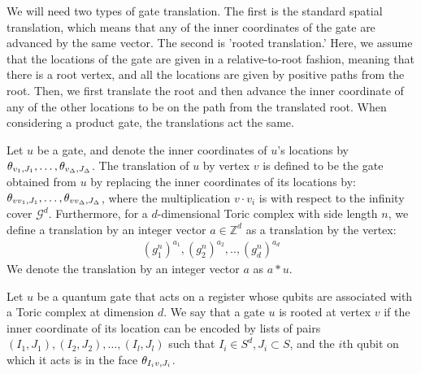 We will need two types of gate translation. The first is the standard spatial translation, which means that any of the inner coordinates of the gate are advanced by the same vector. The second is 'rooted translation.' Here, we assume that the locations of the gate are given in a relative-to-root fashion, meaning that there is a root vertex, and all the locations are given by positive paths from the root. Then, we first translate the root and then advance the inner coordinate of any of the other locations to be on the path from the translated root. When considering a product gate, the translations act the same.   
\begin{definition}
  Let $u$ be a gate, and denote the inner coordinates of $u$'s locations by $\theta_{v_{1} ,J_{1}}, \ldots, \theta_{v_{\Delta} ,J_{\Delta}}$. The translation of $u$ by vertex $v$ is defined to be the gate obtained from $u$ by replacing the inner coordinates of its locations by: $\theta_{v v_{1} ,J_{1}}, \ldots, \theta_{v v_{\Delta} ,J_{\Delta}}$, where the multiplication $v \cdot v_{i}$ is with respect to the infinity cover $\mathcal{G}^{d}$.
  Furthermore, for a $d$-dimensional Toric complex with side length $n$, we define a translation by an integer vector $a \in \mathbb{Z}^{d}$ as a translation by the vertex:
   \begin{equation*}
     \begin{split}
       (g_{1}^{n})^{a_{1}}, (g_{2}^{n})^{a_{2}},.., (g_{d}^{n})^{a_{d}}
     \end{split}
   \end{equation*}
    We denote the translation by an integer vector $a$ as $a * u$.
\end{definition}



\begin{definition}
  Let $u$ be a quantum gate that acts on a register whose qubits are associated with a Toric complex at dimension $d$. We say that a gate $u$ is rooted at vertex $v$ if the inner coordinate of its location can be encoded by lists of pairs $(I_{1}, J_{1}), (I_{2}, J_{2}), \ldots, (I_{l}, J_{l})$ such that $I_{i} \in S^{d}, J_{i} \subset S$, and the $i$th qubit on which it acts is in the face $\theta_{ I_{i} v  ,  J_{i}  }$.
\end{definition}

